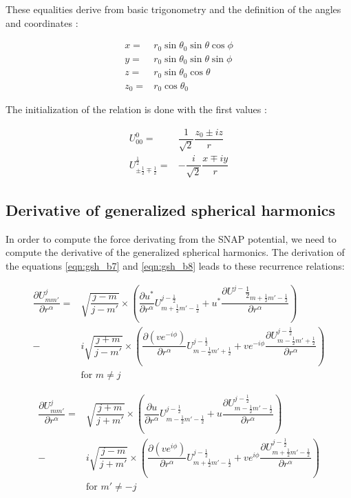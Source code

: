 \documentclass[12pt]{article}
\begin{document}
These equalities derive from basic trigonometry and the definition of the angles and coordinates :

\begin{eqnarray}
x = & r_0 \sin{\theta_0} \sin{\theta} \cos{\phi} \nonumber \\ 
y = & r_0 \sin{\theta_0} \sin{\theta} \sin{\phi} \nonumber \\
z = & r_0 \sin{\theta_0} \cos{\theta} \\
z_0 =  & r_0 \cos{\theta_0} \nonumber
\end{eqnarray}

The initialization of the relation is done with the first values :

\begin{eqnarray}
U^0_{0 0} =& \dfrac{1}{\sqrt{2}}\dfrac{z_0 \pm i z }{r} \\
U^{\frac{1}{2}}_{\pm \frac{1}{2} \mp \frac{1}{2}} =& -\dfrac{i}{\sqrt{2}}\dfrac{x \mp i y}{r} \nonumber
\end{eqnarray}

	\subsection{Derivative of generalized spherical harmonics}

In order to compute the force derivating from the SNAP potential, we need to compute the derivative of the generalized spherical harmonics. The derivation of the equations \ref{eqn:gsh_b7} and \ref{eqn:gsh_b8} leads to these recurrence relations:

\begin{eqnarray} \label{eqn:dgsh_b8}
\dfrac{\partial U^j_{m m'}}{\partial r^\alpha} =& \sqrt{\dfrac{j-m}{j-m'}}\times \left(\dfrac{\partial u^\ast}{\partial r^\alpha} U^{j-\frac{1}{2}}_{m+\frac{1}{2} m'-\frac{1}{2}}+u^\ast \dfrac{\partial U^{j-}\frac{1}{2}_{m+\frac{1}{2} m'-\frac{1}{2}}}{\partial r^{\alpha}}\right) \\
-& i \sqrt{\dfrac{j+m}{j-m'}}\times \left(\dfrac{\partial\left(ve^{-i\phi}\right)}{\partial r^\alpha} U^{j-\frac{1}{2}}_{m-\frac{1}{2} m'+\frac{1}{2}}+v e^{-i\phi} \dfrac{\partial U^{j-\frac{1}{2}}_{m-\frac{1}{2} m'+\frac{1}{2}}}{\partial r^\alpha}\right) \nonumber \\
& \text{for } m \neq j \nonumber
\end{eqnarray}

\begin{eqnarray} \label{eqn:dgsh_b7}
\dfrac{\partial U^j_{m m'}}{\partial r^\alpha} =& \sqrt{\dfrac{j+m}{j+m'}}\times \left(\dfrac{\partial u}{\partial r^\alpha} U^{j-\frac{1}{2}}_{m-\frac{1}{2} m'-\frac{1}{2}}+u \dfrac{\partial U^{j-\frac{1}{2}}_{m-\frac{1}{2} m'-\frac{1}{2}}}{\partial r^\alpha}\right) \\
-& i \sqrt{\dfrac{j-m}{j+m'}}\times \left(\dfrac{\partial\left(ve^{i\phi}\right)}{\partial r^\alpha} U^{j-\frac{1}{2}}_{m+\frac{1}{2} m'-\frac{1}{2}}+v e^{i\phi} \dfrac{\partial U^{j-\frac{1}{2}}_{m+\frac{1}{2} m'-\frac{1}{2}}}{\partial r^\alpha}\right) \nonumber \\
& \text{for } m' \neq -j \nonumber
\end{eqnarray}
\end{document}
